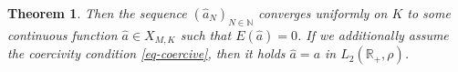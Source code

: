 \documentclass[A4paper,11pt]{article}
\newtheorem{theorem}{Theorem}[section]
\theoremstyle{definition}
\newcommand{\N}{\mathbb{N}}
\newcommand{\R}{\mathbb{R}}
\DeclareMathOperator{\argmin}{arg\,min}
\begin{document}
\begin{theorem}
	Then the sequence $(\widehat a_{N})_{N \in \N}$ converges uniformly on $K$ to some continuous function $\widehat a \in X_{M,K}$ such that
	$E(\widehat a)=0$. If we additionally assume the coercivity condition \eqref{eq-coercive}, then it holds
	$\widehat a=a$ in $L_2(\R_+,\rho)$.
%	
%	
\end{theorem}
\end{document}
